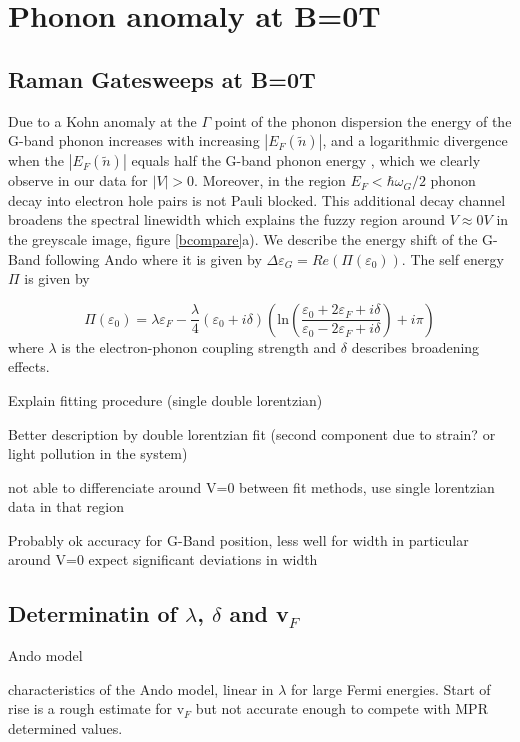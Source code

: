 \documentclass[prl,aps,superscriptaddress,preprint]{revtex4-1}
\begin{document}
\section{Phonon anomaly at B=0T}
\subsection{Raman Gatesweeps at B=0T}
Due to a Kohn anomaly at the $\Gamma$ point of the phonon dispersion the energy of the G-band phonon increases with increasing $\left|E_F(\widetilde{n})\right|$, and a logarithmic divergence when the   $\left|E_F(\widetilde{n})\right|$  equals half the G-band phonon energy \cite{tsuneya2006anomaly,pisana2007breakdown,yan2007electric}, which we clearly observe in our data for $\left|V\right| > 0$. Moreover, in the region $E_F<\hbar \omega_G/2$ phonon decay into electron hole pairs is not Pauli blocked. This additional decay channel broadens the spectral linewidth which explains the fuzzy region around $V\approx 0V$ in the greyscale image, figure \ref{bcompare}a). We describe the energy shift of the G-Band following Ando \cite{tsuneya2006anomaly} where it is given by $\Delta \varepsilon_G=Re(\Pi(\varepsilon_0))$. The self energy $\Pi$ is given by

\begin{equation}
\label{ando-anomaly}
\Pi(\varepsilon_0) = \lambda \varepsilon_F -\frac{\lambda}{4}\left(\varepsilon_0+i\delta\right)\left(\mathrm{ln}\left(\frac{\varepsilon_0+2\varepsilon_F+i\delta}{\varepsilon_0-2\varepsilon_F+i\delta}\right)+i\pi\right)
\end{equation}
where $\lambda$ is the electron-phonon coupling strength and $\delta$ describes broadening effects.

Explain fitting procedure (single double lorentzian)

Better description by double lorentzian fit (second component due to strain? or light pollution in the system)

not able to differenciate around V=0 between fit methods, use single lorentzian data in that region

Probably ok accuracy for G-Band position, less well for width in particular around V=0 expect significant deviations in width
\subsection{Determinatin of $\lambda$, $\delta$ and v$_F$}
Ando model

characteristics of the Ando model, linear in $\lambda$ for large Fermi energies. Start of rise is a rough estimate for v$_F$ but not accurate enough to compete with MPR determined values.
\end{document}
